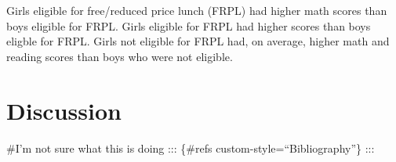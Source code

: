 \documentclass[
  english,
  man]{apa6}
\begin{document}
Girls eligible for free/reduced price lunch (FRPL) had higher math scores than boys eligible for FRPL. Girls eligible for FRPL had higher scores than boys eligble for FRPL. Girls not eligible for FRPL had, on average, higher math and reading scores than boys who were not eligible.

\hypertarget{discussion}{%
\section{Discussion}\label{discussion}}

\begingroup
\setlength{\parindent}{-0.5in}
\setlength{\leftskip}{0.5in}

\newpage

\#I'm not sure what this is doing
::: \{\#refs custom-style=\enquote{Bibliography}\}
:::

\endgroup


\printbibliography
\end{document}
